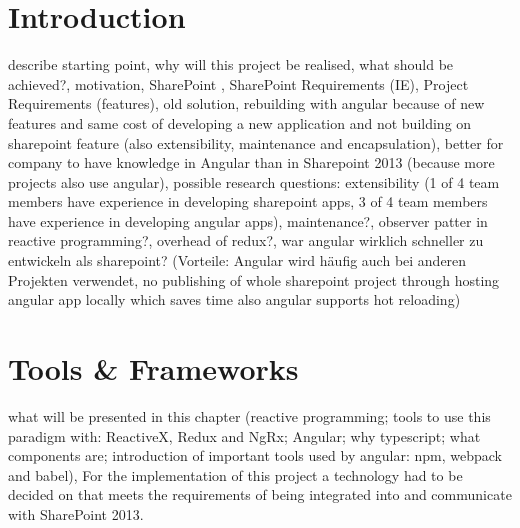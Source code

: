 \documentclass[Bachelor,BIF,english]{twbook}
\begin{document}
{{{    \newcommand{\citefigm}[2]{(Source: taken with modification from \protect\cite{#1}, p. #2)}%
    \newcommand{\citep}{\citeasnoun}%
    \newcommand{\acessedthrough}{Available at:}%
    \newcommand{\acessedthroughp}{Available through:}%
    \newcommand{\acessedat}{Accessed}%
    \newcommand{\singlepage}{p.}%
    \newcommand{\multiplepages}{pp.}%
    \newcommand{\chapternr}{Ch.}%
    \renewcommand{\harvardand}{\&}%
    \newcommand{\abstractonly}{Abstract only}
    \newcommand{\edition}{~edition}%
}}}

\maketitle
\chapter{Introduction}
describe starting point, why will this project be realised, what should be achieved?, motivation, SharePoint \cite{SharePoint}, SharePoint Requirements (IE), Project Requirements (features), old solution, rebuilding with angular because of new features and same cost of developing a new application and not building on sharepoint feature (also extensibility, maintenance and encapsulation), better for company to have knowledge in Angular than in Sharepoint 2013 (because more projects also use angular), possible research questions: extensibility (1 of 4 team members have experience in developing sharepoint apps, 3 of 4 team members have experience in developing angular apps), maintenance?, observer patter in reactive programming?, overhead of redux?, war angular wirklich schneller zu entwickeln als sharepoint? (Vorteile: Angular wird häufig auch bei anderen Projekten verwendet, no publishing of whole sharepoint project through hosting angular app locally which saves time also angular supports hot reloading)
\clearpage


\chapter{Tools \& Frameworks} 
what will be presented in this chapter (reactive programming; tools to use this paradigm with: ReactiveX, Redux and NgRx; Angular; why typescript; what components are; introduction of important tools used by angular: npm, webpack and babel),
For the implementation of this project a technology had to be decided on that meets the requirements of being integrated into and communicate with SharePoint 2013.
\end{document}
